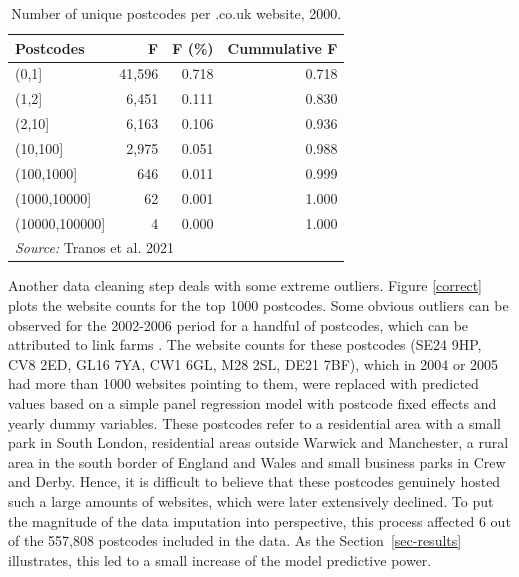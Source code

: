 \documentclass[
  authoryear,
  preprint,
  3p]{elsarticle}
\begin{document}
\begin{table}

\caption{Number of unique postcodes per .co.uk website, 2000.\label{f2000}}
\centering
\begin{tabular}[t]{lrrr}
\toprule
Postcodes & F & F (\%) & Cummulative F\\
\midrule
(0,1] & 41,596 & 0.718 & 0.718\\
(1,2] & 6,451 & 0.111 & 0.830\\
(2,10] & 6,163 & 0.106 & 0.936\\
(10,100] & 2,975 & 0.051 & 0.988\\
(100,1000] & 646 & 0.011 & 0.999\\
\addlinespace
(1000,10000] & 62 & 0.001 & 1.000\\
(10000,100000] & 4 & 0.000 & 1.000\\
\bottomrule
\multicolumn{4}{l}{\rule{0pt}{1em}\textit{Source: } Tranos et al. 2021}\\
\end{tabular}
\end{table}

Another data cleaning step deals with some extreme outliers. Figure
\ref{correct} plots the website counts for the top 1000 postcodes. Some
obvious outliers can be observed for the 2002-2006 period for a handful
of postcodes, which can be attributed to link farms \citep{BL2013links}.
The website counts for these postcodes (SE24 9HP, CV8 2ED, GL16 7YA, CW1
6GL, M28 2SL, DE21 7BF), which in 2004 or 2005 had more than 1000
websites pointing to them, were replaced with predicted values based on
a simple panel regression model with postcode fixed effects and yearly
dummy variables. These postcodes refer to a residential area with a
small park in South London, residential areas outside Warwick and
Manchester, a rural area in the south border of England and Wales and
small business parks in Crew and Derby. Hence, it is difficult to
believe that these postcodes genuinely hosted such a large amounts of
websites, which were later extensively declined. To put the magnitude of
the data imputation into perspective, this process affected 6 out of the
557,808 postcodes included in the data. As the Section~\ref{sec-results}
illustrates, this led to a small increase of the model predictive power.
\end{document}
